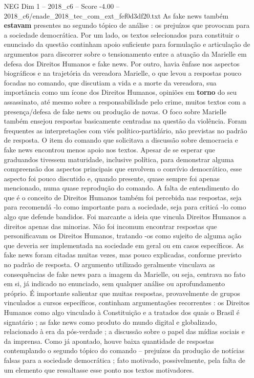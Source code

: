 \begin{textsample}{NEG Dim 1 – 2018\_c6 – Score -4.00 – 2018\_c6/enade\_2018\_tec\_com\_ext\_fef0d3df20.txt}
As fake news também \textbf{estavam} presentes no segundo tópico de análise : os prejuízos que provocam para a sociedade democrática.
Por um lado, os textos selecionados para constituir o enunciado da questão continham apoio suficiente para formulação e articulação de argumentos para discorrer sobre o tensionamento entre a atuação da Marielle em defesa dos Direitos Humanos e fake news.
Por outro, havia ênfase nos aspectos biográficos e na trajetória da vereadora Marielle, o que levou a respostas pouco focadas no comando, que discutiam a vida e a morte da vereadora, sua importância como um ícone dos Direitos Humanos, opiniões em \textbf{torno} do seu assassinato, até mesmo sobre a responsabilidade pelo crime, muitos textos com a presença/defesa de fake news ou produção de novas.
O foco sobre Marielle também ensejou respostas basicamente centradas na questão da violência.
Foram frequentes as interpretações com viés político-partidário, não previstas no padrão de resposta.
O item do comando que solicitava a discussão sobre democracia e fake news encontrou menos apoio nos textos.
Apesar de se esperar que graduandos tivessem maturidade, inclusive política, para demonstrar alguma compreensão dos aspectos principais que envolvem o convívio democrático, esse aspecto foi pouco discutido e, quando presente, quase sempre foi apenas mencionado, numa quase reprodução do comando.
A falta de entendimento do que é o conceito de Direitos Humanos também foi percebida nas respostas, seja para recomendá -lo como importante para a sociedade, seja para criticá -lo como algo que defende bandidos.
Foi marcante a ideia que vincula Direitos Humanos a direitos apenas das minorias.
Não foi incomum encontrar respostas que personificavam os Direitos Humanos, tratando -os como sujeito de alguma ação que deveria ser implementada na sociedade em geral ou em casos específicos.
As fake news foram citadas muitas vezes, mas pouco explicadas, conforme previsto no padrão de resposta.
O argumento utilizado geralmente vinculava as consequências de fake news para a imagem da Marielle, ou seja, centrava no fato em si, já indicado no enunciado, sem qualquer análise ou aprofundamento próprio.
É importante salientar que muitas respostas, provavelmente de grupos vinculados a cursos específicos, continham argumentações recorrentes : os Direitos Humanos como algo vinculado à Constituição e a tratados dos quais o Brasil é signatário ; as fake news como produto do mundo digital e globalizado, relacionado à era da pós-verdade ; a discussão sobre o papel das mídias sociais e da imprensa.
Como já apontado, houve baixa quantidade de respostas contemplando o segundo tópico do comando – prejuízos da produção de notícias falsas para a sociedade democrática ; fato motivado, possivelmente, pela falta de um elemento que ressaltasse esse ponto nos textos motivadores.

\end{textsample}
